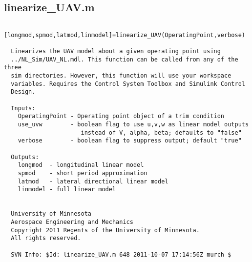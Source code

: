 \documentclass[12pt]{article}
\begin{document}
\subsection{linearize\_UAV.m}
\begin{verbatim}
  [longmod,spmod,latmod,linmodel]=linearize_UAV(OperatingPoint,verbose)
 
  Linearizes the UAV model about a given operating point using
  ../NL_Sim/UAV_NL.mdl. This function can be called from any of the three
  sim directories. However, this function will use your workspace
  variables. Requires the Control System Toolbox and Simulink Control
  Design.
 
  Inputs:
    OperatingPoint - Operating point object of a trim condition
    use_uvw        - boolean flag to use u,v,w as linear model outputs 
                      instead of V, alpha, beta; defaults to "false"
    verbose        - boolean flag to suppress output; default "true"
 
  Outputs:
    longmod  - longitudinal linear model
    spmod    - short period approximation
    latmod   - lateral directional linear model
    linmodel - full linear model
 
 
  University of Minnesota 
  Aerospace Engineering and Mechanics 
  Copyright 2011 Regents of the University of Minnesota. 
  All rights reserved.
 
  SVN Info: $Id: linearize_UAV.m 648 2011-10-07 17:14:56Z murch $


\end{verbatim}
\end{document}
